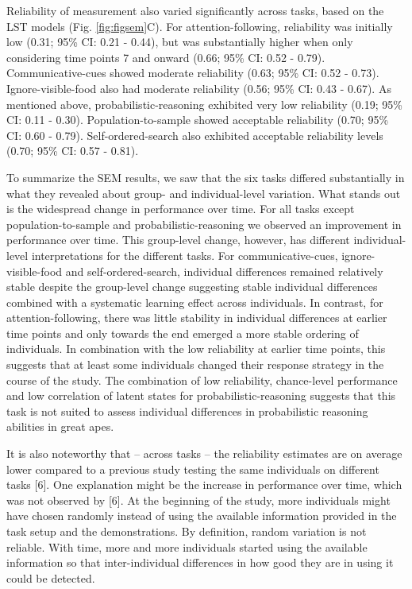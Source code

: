 \documentclass[
  man,floatsintext]{apa6}
\begin{document}
Reliability of measurement also varied significantly across tasks, based on the LST models (Fig. \ref{fig:figsem}C). For attention-following, reliability was initially low (0.31; 95\% CI: 0.21 - 0.44), but was substantially higher when only considering time points 7 and onward (0.66; 95\% CI: 0.52 - 0.79). Communicative-cues showed moderate reliability (0.63; 95\% CI: 0.52 - 0.73). Ignore-visible-food also had moderate reliability (0.56; 95\% CI: 0.43 - 0.67). As mentioned above, probabilistic-reasoning exhibited very low reliability (0.19; 95\% CI: 0.11 - 0.30). Population-to-sample showed acceptable reliability (0.70; 95\% CI: 0.60 - 0.79). Self-ordered-search also exhibited acceptable reliability levels (0.70; 95\% CI: 0.57 - 0.81).

To summarize the SEM results, we saw that the six tasks differed substantially in what they revealed about group- and individual-level variation. What stands out is the widespread change in performance over time. For all tasks except population-to-sample and probabilistic-reasoning we observed an improvement in performance over time. This group-level change, however, has different individual-level interpretations for the different tasks. For communicative-cues, ignore-visible-food and self-ordered-search, individual differences remained relatively stable despite the group-level change suggesting stable individual differences combined with a systematic learning effect across individuals. In contrast, for attention-following, there was little stability in individual differences at earlier time points and only towards the end emerged a more stable ordering of individuals. In combination with the low reliability at earlier time points, this suggests that at least some individuals changed their response strategy in the course of the study. The combination of low reliability, chance-level performance and low correlation of latent states for probabilistic-reasoning suggests that this task is not suited to assess individual differences in probabilistic reasoning abilities in great apes.

It is also noteworthy that -- across tasks -- the reliability estimates are on average lower compared to a previous study testing the same individuals on different tasks {[}6{]}. One explanation might be the increase in performance over time, which was not observed by {[}6{]}. At the beginning of the study, more individuals might have chosen randomly instead of using the available information provided in the task setup and the demonstrations. By definition, random variation is not reliable. With time, more and more individuals started using the available information so that inter-individual differences in how good they are in using it could be detected.
\end{document}
